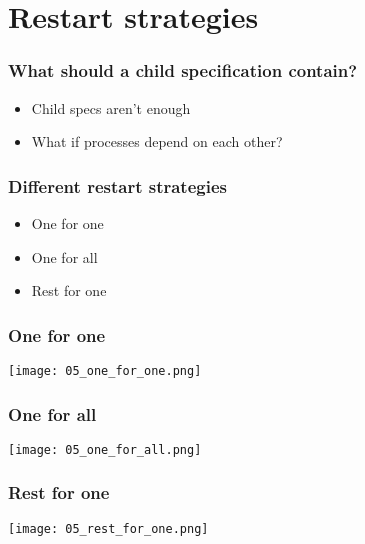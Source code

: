 \section{Restart strategies}

\frame{\tableofcontents[currentsection]}

\begin{frame}
    \frametitle{What should a child specification contain?}
    \begin{itemize}
        \item Child specs aren't enough
        \item What if processes depend on each other?
    \end{itemize}
\end{frame}

\begin{frame}
    \frametitle{Different restart strategies}
    \begin{itemize}
        \item One for one
        \item One for all
        \item Rest for one
    \end{itemize}
\end{frame}

\begin{frame}
    \frametitle{One for one}
    \begin{center}
        \texttt{[image: 05\_one\_for\_one.png]}
    \end{center}
\end{frame}

\begin{frame}
    \frametitle{One for all}
    \begin{center}
        \texttt{[image: 05\_one\_for\_all.png]}
    \end{center}
\end{frame}

\begin{frame}
    \frametitle{Rest for one}
    \begin{center}
        \texttt{[image: 05\_rest\_for\_one.png]}
    \end{center}
\end{frame}

